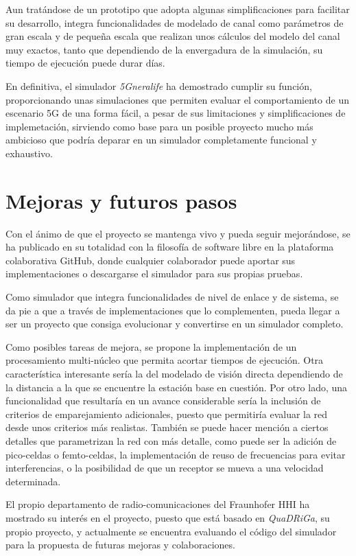 Aun tratándose de un prototipo que adopta algunas simplificaciones para facilitar su desarrollo, integra funcionalidades de modelado de canal como parámetros de gran escala y de pequeña escala que realizan unos cálculos del modelo del canal muy exactos, tanto que dependiendo de la envergadura de la simulación, su tiempo de ejecución puede durar días.

En definitiva, el simulador \textit{5Gneralife} ha demostrado cumplir su función, proporcionando unas simulaciones que permiten evaluar el comportamiento de un escenario 5G de una forma fácil, a pesar de sus limitaciones y simplificaciones de implemetación, sirviendo como base para un posible proyecto mucho más ambicioso que podría deparar en un simulador completamente funcional y exhaustivo.

\section{Mejoras y futuros pasos}
Con el ánimo de que el proyecto se mantenga vivo y pueda seguir mejorándose, se ha publicado en su totalidad con la filosofía de software libre en la plataforma colaborativa GitHub, donde cualquier colaborador puede aportar sus implementaciones o descargarse el simulador para sus propias pruebas.

Como simulador que integra funcionalidades de nivel de enlace y de sistema, se da pie a que a través de implementaciones que lo complementen, pueda llegar a ser un proyecto que consiga evolucionar y convertirse en un simulador completo.

Como posibles tareas de mejora, se propone la implementación de un procesamiento multi-núcleo que permita acortar tiempos de ejecución. Otra característica interesante sería la del modelado de visión directa dependiendo de la distancia a la que se encuentre la estación base en cuestión. Por otro lado, una funcionalidad que resultaría en un avance considerable sería la inclusión de criterios de emparejamiento adicionales, puesto que permitiría evaluar la red desde unos criterios más realistas. También se puede hacer mención a ciertos detalles que parametrizan la red con más detalle, como puede ser la adición de pico-celdas o femto-celdas, la implementación de reuso de frecuencias para evitar interferencias, o la posibilidad de que un receptor se mueva a una velocidad determinada. 

El propio departamento de radio-comunicaciones del Fraunhofer HHI ha mostrado su interés en el proyecto, puesto que está basado en \textit{QuaDRiGa}, su propio proyecto, y actualmente se encuentra evaluando el código del simulador para la propuesta de futuras mejoras y colaboraciones.